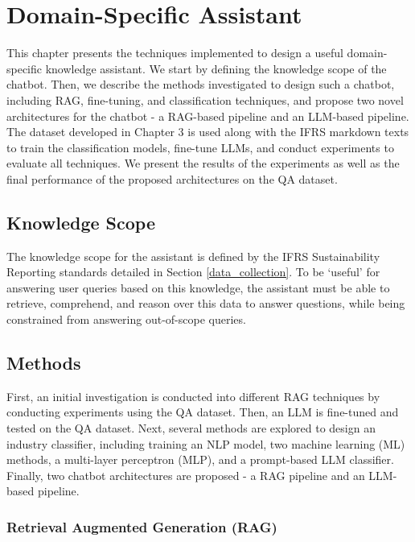 
\chapter{Domain-Specific Assistant}


This chapter presents the techniques implemented to design a useful domain-specific knowledge assistant. We start by defining the knowledge scope of the chatbot. Then, we describe the methods investigated to design such a chatbot, including RAG, fine-tuning, and classification techniques, and propose two novel architectures for the chatbot - a RAG-based pipeline and an LLM-based pipeline. The dataset developed in Chapter 3 is used along with the IFRS markdown texts to train the classification models, fine-tune LLMs, and conduct experiments to evaluate all techniques. We present the results of the experiments as well as the final performance of the proposed architectures on the QA dataset.


\section{Knowledge Scope}

The knowledge scope for the assistant is defined by the IFRS Sustainability Reporting standards detailed in Section \ref{data_collection}. To be `useful' for answering user queries based on this knowledge, the assistant must be able to retrieve, comprehend, and reason over this data to answer questions, while being constrained from answering out-of-scope queries.

\section{Methods} 

First, an initial investigation is conducted into different RAG techniques by conducting experiments using the QA dataset. Then, an LLM is fine-tuned and tested on the QA dataset. Next, several methods are explored to design an industry classifier, including training an NLP model, two machine learning (ML) methods, a multi-layer perceptron (MLP), and a prompt-based LLM classifier. Finally, two chatbot architectures are proposed - a RAG pipeline and an LLM-based pipeline.

\subsection{Retrieval Augmented Generation (RAG)}

